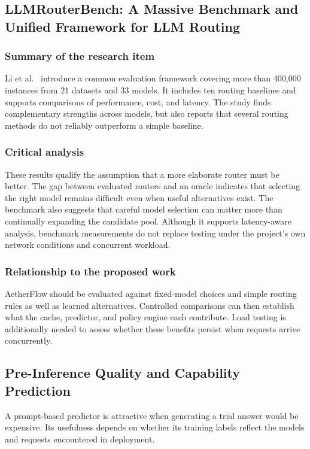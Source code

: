 \subsection{LLMRouterBench: A Massive Benchmark and Unified Framework for LLM Routing}
\subsubsection{Summary of the research item}
Li et al.\ \cite{ref:LLMRouterBench} introduce a common evaluation framework covering more than 400,000 instances from 21 datasets and 33 models. It includes ten routing baselines and supports comparisons of performance, cost, and latency. The study finds complementary strengths across models, but also reports that several routing methods do not reliably outperform a simple baseline.

\subsubsection{Critical analysis}
These results qualify the assumption that a more elaborate router must be better. The gap between evaluated routers and an oracle indicates that selecting the right model remains difficult even when useful alternatives exist. The benchmark also suggests that careful model selection can matter more than continually expanding the candidate pool. Although it supports latency-aware analysis, benchmark measurements do not replace testing under the project's own network conditions and concurrent workload.

\subsubsection{Relationship to the proposed work}
AetherFlow should be evaluated against fixed-model choices and simple routing rules as well as learned alternatives. Controlled comparisons can then establish what the cache, predictor, and policy engine each contribute. Load testing is additionally needed to assess whether these benefits persist when requests arrive concurrently.

\subsection*{Pre-Inference Quality and Capability Prediction}

A prompt-based predictor is attractive when generating a trial answer would be expensive. Its usefulness depends on whether its training labels reflect the models and requests encountered in deployment.

